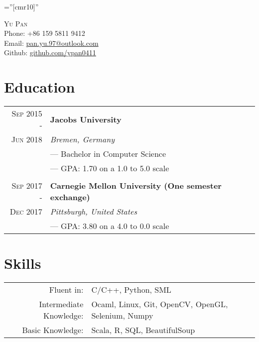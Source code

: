 \documentclass[a4paper,10pt]{article}
\begin{document}
	
	
	\pagestyle{empty} %
	
	\font\fb=''[cmr10]'' %
	
	\par{\centering
		{\huge{\textsc{Yu Pan}}}\\
		Phone: +86 159 5811 9412 \\
		Email: \href{mailto:pan.yu.97@outlook.com}{pan.yu.97@outlook.com}\\
		Github: \href{https://github.com/ypan0411}{github.com/ypan0411} \par}
	
	\section{Education}
	\begin{tabular}{r|l}
		\textsc{Sep 2015 - } & \textbf{Jacobs University} \\\textsc{Jun 2018}&\emph{Bremen, Germany}
		\\& --- Bachelor in Computer Science
		\\& --- GPA: 1.70 on a 1.0 to 5.0 scale
		\\ \multicolumn{1}{c}{} \\
		\textsc{Sep 2017 - } & \textbf{Carnegie Mellon University (One semester exchange)} \\\textsc{Dec 2017}&\emph{Pittsburgh, United States}
		\\& --- GPA: 3.80 on a 4.0 to 0.0 scale
	\end{tabular}
	
	
	\section{Skills}
	\begin{tabular}{rl}
		Fluent in: & C/C++, Python, SML\\
		Intermediate Knowledge:& Ocaml, Linux, Git, OpenCV, OpenGL, Selenium, Numpy\\
		Basic Knowledge:& Scala, R, SQL, BeautifulSoup\\
	\end{tabular}
	
\end{document}
